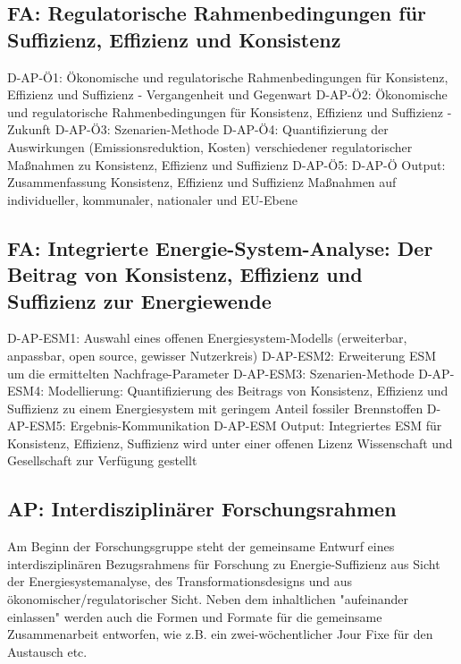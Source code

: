 \documentclass[a4paper,11pt,twoside]{scrartcl}
\begin{document}
\subsection*{FA: Regulatorische Rahmenbedingungen für Suffizienz, Effizienz und Konsistenz}
D-AP-Ö1: Ökonomische und regulatorische Rahmenbedingungen für Konsistenz, Effizienz und Suffizienz - Vergangenheit und Gegenwart
D-AP-Ö2: Ökonomische und regulatorische Rahmenbedingungen für Konsistenz, Effizienz und Suffizienz - Zukunft
D-AP-Ö3: Szenarien-Methode
D-AP-Ö4: Quantifizierung der Auswirkungen (Emissionsreduktion, Kosten) verschiedener regulatorischer Maßnahmen zu Konsistenz, Effizienz und Suffizienz
D-AP-Ö5: 
D-AP-Ö Output: Zusammenfassung Konsistenz, Effizienz und Suffizienz Maßnahmen auf individueller, kommunaler, nationaler und EU-Ebene

\subsection*{FA: Integrierte Energie-System-Analyse: Der Beitrag von Konsistenz, Effizienz und Suffizienz zur Energiewende}
D-AP-ESM1: Auswahl eines offenen Energiesystem-Modells (erweiterbar, anpassbar, open source, gewisser Nutzerkreis)
D-AP-ESM2: Erweiterung ESM um die ermittelten Nachfrage-Parameter
D-AP-ESM3: Szenarien-Methode
D-AP-ESM4: Modellierung: Quantifizierung des Beitrags von Konsistenz, Effizienz und Suffizienz zu einem Energiesystem mit geringem Anteil fossiler Brennstoffen
D-AP-ESM5: Ergebnis-Kommunikation
D-AP-ESM Output: Integriertes ESM für Konsistenz, Effizienz, Suffizienz wird unter einer offenen Lizenz Wissenschaft und Gesellschaft zur Verfügung gestellt


\subsection*{AP: Interdisziplinärer Forschungsrahmen}
Am Beginn der Forschungsgruppe steht der gemeinsame Entwurf eines interdisziplinären Bezugsrahmens für Forschung zu Energie-Suffizienz aus Sicht der Energiesystemanalyse, des Transformationsdesigns und aus ökonomischer/regulatorischer Sicht. Neben dem inhaltlichen "aufeinander einlassen" werden auch die Formen und Formate für die gemeinsame Zusammenarbeit entworfen, wie z.B. ein zwei-wöchentlicher Jour Fixe für den Austausch etc.
\end{document}
